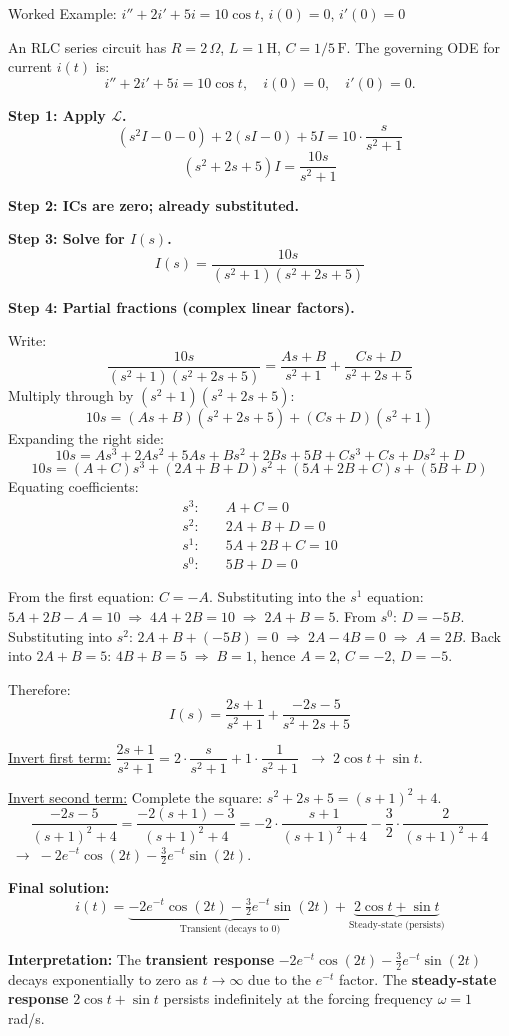 \documentclass[12pt,a4paper]{article}
\begin{document}
\begin{infobox}{Worked Example: $i'' + 2i' + 5i = 10\cos t$, $i(0)=0$, $i'(0)=0$}

An RLC series circuit has $R=2\,\Omega$, $L=1\,\text{H}$, $C=1/5\,\text{F}$.
The governing ODE for current $i(t)$ is:
\[
i'' + 2i' + 5i = 10\cos t, \quad i(0)=0,\quad i'(0)=0.
\]

\textbf{Step 1: Apply $\mathcal{L}$.}
\[
(s^2I - 0 - 0) + 2(sI - 0) + 5I = 10\cdot\frac{s}{s^2+1}
\]
\[
(s^2+2s+5)I = \frac{10s}{s^2+1}
\]

\textbf{Step 2: ICs are zero; already substituted.}

\textbf{Step 3: Solve for $I(s)$.}
\[
I(s) = \frac{10s}{(s^2+1)(s^2+2s+5)}
\]

\textbf{Step 4: Partial fractions (complex linear factors).}

Write:
\[
\frac{10s}{(s^2+1)(s^2+2s+5)} = \frac{As+B}{s^2+1} + \frac{Cs+D}{s^2+2s+5}
\]
Multiply through by $(s^2+1)(s^2+2s+5)$:
\[
10s = (As+B)(s^2+2s+5) + (Cs+D)(s^2+1)
\]
Expanding the right side:
\[
10s = As^3+2As^2+5As+Bs^2+2Bs+5B + Cs^3+Cs+Ds^2+D
\]
\[
10s = (A+C)s^3 + (2A+B+D)s^2 + (5A+2B+C)s + (5B+D)
\]
Equating coefficients:
\begin{align*}
s^3: &\quad A+C = 0 \\
s^2: &\quad 2A+B+D = 0 \\
s^1: &\quad 5A+2B+C = 10 \\
s^0: &\quad 5B+D = 0
\end{align*}

From the first equation: $C = -A$.
Substituting into the $s^1$ equation: $5A+2B-A=10 \;\Rightarrow\; 4A+2B=10 \;\Rightarrow\; 2A+B=5$.
From $s^0$: $D=-5B$.
Substituting into $s^2$: $2A+B+(-5B)=0 \;\Rightarrow\; 2A-4B=0 \;\Rightarrow\; A=2B$.
Back into $2A+B=5$: $4B+B=5 \;\Rightarrow\; B=1$, hence $A=2$, $C=-2$, $D=-5$.

Therefore:
\[
I(s) = \frac{2s+1}{s^2+1} + \frac{-2s-5}{s^2+2s+5}
\]

\underline{Invert first term:}
$\dfrac{2s+1}{s^2+1} = 2\cdot\dfrac{s}{s^2+1} + 1\cdot\dfrac{1}{s^2+1}$
$\;\longrightarrow\; 2\cos t + \sin t$.

\underline{Invert second term:} Complete the square: $s^2+2s+5=(s+1)^2+4$.
\[
\frac{-2s-5}{(s+1)^2+4}
= \frac{-2(s+1)-3}{(s+1)^2+4}
= -2\cdot\frac{s+1}{(s+1)^2+4} - \frac{3}{2}\cdot\frac{2}{(s+1)^2+4}
\]
$\;\longrightarrow\; -2e^{-t}\cos(2t) - \tfrac{3}{2}e^{-t}\sin(2t)$.

\textbf{Final solution:}
\[
\boxed{i(t) = \underbrace{-2e^{-t}\cos(2t) - \tfrac{3}{2}e^{-t}\sin(2t)}_{\text{Transient (decays to 0)}}
              + \underbrace{2\cos t + \sin t}_{\text{Steady-state (persists)}}}
\]

\textbf{Interpretation:}
The \textbf{transient response} $-2e^{-t}\cos(2t) - \tfrac{3}{2}e^{-t}\sin(2t)$ decays
exponentially to zero as $t\to\infty$ due to the $e^{-t}$ factor.
The \textbf{steady-state response} $2\cos t + \sin t$ persists indefinitely at the
forcing frequency $\omega=1$ rad/s.
\end{infobox}
\end{document}
